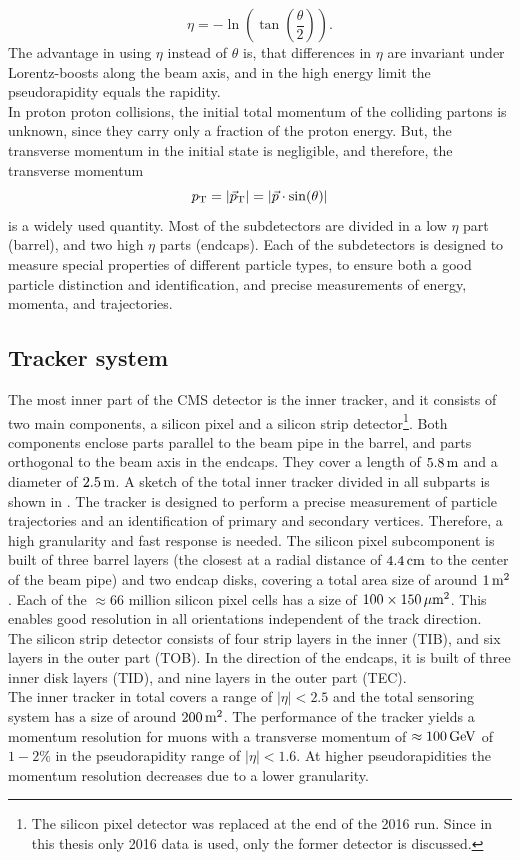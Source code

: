 \begin{equation}
 \eta=-\ln\left(\tan\left(\frac{\theta}{2}\right)\right).
\end{equation}
The advantage in using $\eta$ instead of $\theta$ is, that differences in $\eta$ are invariant under Lorentz-boosts along the beam axis, and in the high energy limit the pseudorapidity equals the rapidity.\\
In proton proton collisions, the initial total momentum of the colliding partons is unknown, since they carry only a fraction of the proton energy. But, the transverse momentum in the initial state is negligible, and therefore, the transverse momentum
\begin{equation}
 p_{\mathrm{T}}=|{\vec p}_{\mathrm{T}}|=|\vec{p}\cdot\sin(\theta)|
\end{equation}
is a widely used quantity.
Most of the subdetectors are divided in a low $\eta$ part (barrel), and two high $\eta$ parts (endcaps). Each of the subdetectors is designed to measure special properties of different particle types, to ensure both a good particle distinction and identification, and precise measurements of energy, momenta, and trajectories.



\subsection{Tracker system}
The most inner part of the CMS detector is the inner tracker, and it consists of two main components, a silicon pixel and a silicon strip detector\footnote{The silicon pixel detector was replaced at the end of the 2016 run. Since in this thesis only 2016 data is used, only the former detector is discussed.}. Both components enclose parts parallel to the beam pipe in the barrel, and parts orthogonal to the beam axis in the endcaps. They cover a length of $5.8\,\text{m}$ and a diameter of $2.5\,\text{m}$. A sketch of the total inner tracker divided in all subparts is shown in . The tracker is designed to perform a precise measurement of particle trajectories and an identification of primary and secondary vertices. Therefore, a high granularity and fast response is needed. The silicon pixel subcomponent is built of three barrel layers (the closest at a radial distance of $4.4\,\text{cm}$ to the center of the beam pipe) and two endcap disks, covering a total area size of around $1\,\text{m}^2$. Each of the $\approx66$ million silicon pixel cells has a size of $100\times150\,\mu\text{m}^2$. This enables good resolution in all orientations independent of the track direction.\\
The silicon strip detector consists of four strip layers in the inner (TIB), and six layers in the outer part (TOB). In the direction of the endcaps, it is built of three inner disk layers (TID), and nine layers in the outer part (TEC).\\
The inner tracker in total covers a range of $|\eta|<2.5$ and the total sensoring system has a size of around $200\,\text{m}^2$. The performance of the tracker yields a momentum resolution for muons with a transverse momentum of $\approx100\,\text{Ge\hspace{-.08em}V}$ of $1-2\%$ in the pseudorapidity range of $|\eta|<1.6$. At higher pseudorapidities the momentum resolution decreases due to a lower granularity.

